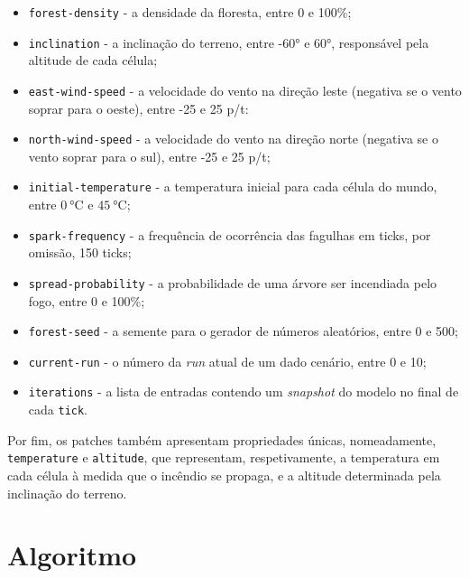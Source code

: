 \begin{itemize}
    \item \texttt{forest-density} - a densidade da floresta, entre 0 e 100\%;
    \item \texttt{inclination} - a inclinação do terreno, entre \ang{-60} e \ang{60}, responsável pela altitude de cada célula;
    \item \texttt{east-wind-speed} - a velocidade do vento na direção leste (negativa se o vento soprar para o oeste), entre -25 e 25 p/t:
    \item \texttt{north-wind-speed} - a velocidade do vento na direção norte (negativa se o vento soprar para o sul), entre -25 e 25 p/t;
    \item \texttt{initial-temperature} - a temperatura inicial para cada célula do mundo, entre $\SI{0}{\degreeCelsius}$ e $\SI{45}{\degreeCelsius}$;
    \item \texttt{spark-frequency} - a frequência de ocorrência das fagulhas em ticks, por omissão, 150 ticks;
    \item \texttt{spread-probability} - a probabilidade de uma árvore ser incendiada pelo fogo, entre 0 e 100\%;
    \item \texttt{forest-seed} - a semente para o gerador de números aleatórios, entre 0 e 500;
    \item \texttt{current-run} - o número da \textit{run} atual de um dado cenário, entre 0 e 10;
    \item \texttt{iterations} - a lista de entradas contendo um \textit{snapshot} do modelo no final de cada \texttt{tick}.
\end{itemize}

Por fim, os patches também apresentam propriedades únicas, nomeadamente, \texttt{temperature} e \texttt{altitude}, que representam, respetivamente, a temperatura em cada célula à medida que o incêndio se propaga, e a altitude determinada pela inclinação do terreno.


\section{Algoritmo}\label{sec:algorithm}


